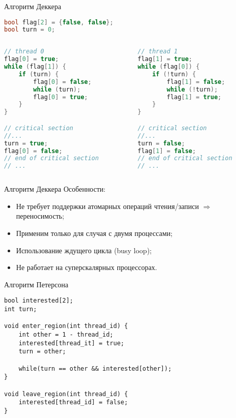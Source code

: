 \begin{frame}[fragile]{Алгоритм Деккера}
\begin{lstlisting}[language=C++,basicstyle=\ttfamily,keywordstyle=\color{blue},basicstyle=\scriptsize]
bool flag[2] = {false, false};
bool turn = 0;
\end{lstlisting}

\begin{columns}[t]
    \begin{column}[T]{0.45\textwidth}
        \begin{lstlisting}[language=C++,basicstyle=\ttfamily,keywordstyle=\color{blue},basicstyle=\scriptsize]
// thread 0
flag[0] = true;
while (flag[1]) {
    if (turn) {
        flag[0] = false;
        while (turn);
        flag[0] = true;
    }
}

// critical section
//...
turn = true;
flag[0] = false;
// end of critical section
// ...
        \end{lstlisting}
    \end{column}
    \begin{column}[T]{0.45\textwidth}
        \begin{lstlisting}[language=C++,basicstyle=\ttfamily,keywordstyle=\color{blue},basicstyle=\scriptsize]
// thread 1
flag[1] = true;
while (flag[0]) {
    if (!turn) {
        flag[1] = false;
        while (!turn);
        flag[1] = true;
    }
}

// critical section
//...
turn = false;
flag[1] = false;
// end of critical section
// ...
        \end{lstlisting}
    \end{column}
\end{columns}
\end{frame}

\begin{frame}{Алгоритм Деккера}
Особенности:
\begin{itemize}
    \item Не требует поддержки атомарных операций чтения/записи $\Rightarrow$
    переносимость;
    \item Применим только для случая с двумя процессами;
    \item Использование ждущего цикла (\abbr busy loop);
    \item Не работает на суперскалярных процессорах.
\end{itemize}
\end{frame}

\begin{frame}[fragile]{Алгоритм Петерсона}
\begin{lstlisting}[basicstyle=\small]
bool interested[2];
int turn;

void enter_region(int thread_id) {
    int other = 1 - thread_id;
    interested[thread_it] = true;
    turn = other;

    while(turn == other && interested[other]);
}

void leave_region(int thread_id) {
    interested[thread_id] = false;
}
\end{lstlisting}
\end{frame}

